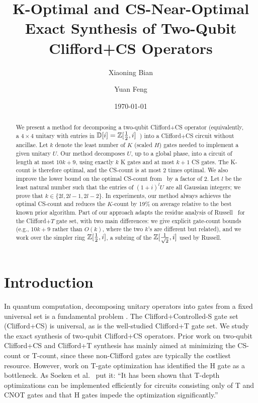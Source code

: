 \documentclass[reprint,amsmath,amssymb,aps,pra]{revtex4-2}
\begin{document}
\title{K-Optimal and CS-Near-Optimal Exact Synthesis of Two-Qubit
	Clifford+CS Operators}

\author{Xiaoning Bian} 

\author{Yuan Feng} 


\date{\today}

\begin{abstract}
  We present a method for decomposing a two-qubit Clifford+CS operator
  (equivalently, a $4\times 4$ unitary with entries in
  ${\mathbb D}[i] = \mathbb{Z}[\tfrac{1}{2}, i]$~\cite{Amy-Glaudell-Ross}) into a
  Clifford$+$CS circuit without ancillae. Let $k$ denote the least
  number of $K$ (scaled $H$) gates needed to implement a given unitary
  $U$. Our method decomposes $U$, up to a global phase, into a circuit
  of length at most $10k+9$, using exactly $k$ K gates and at most
  $k+1$ CS gates. The K-count is therefore optimal, and the CS-count
  is at most $2$ times optimal. We also improve the lower bound on the
  optimal CS-count from~\cite{Glaudell2021} by a factor of $2$. Let
  $l$ be the least natural number such that the entries of $(1+i)^l U$
  are all Gaussian integers; we prove that $k \in \{2l, 2l-1,
  2l-2\}$. In experiments, our method always achieves the optimal
  CS-count and reduces the $K$-count by 19\% on average relative to
  the best known prior algorithm. Part of our approach adapts the
  residue analysis of Russell~\cite{russell2014} for the Clifford$+T$
  gate set, with two main differences: we give explicit gate-count
  bounds (e.g., $10k+9$ rather than $O(k)$, where the two $k$'s are
  different but related), and we work over the simpler ring
  $\mathbb{Z}[\tfrac{1}{2}, i]$, a subring of the $\mathbb{Z}[\tfrac{1}{\sqrt 2}, i]$
  used by Russell.
\end{abstract}

\maketitle

\section{Introduction}

In quantum computation, decomposing unitary operators into gates from
a fixed universal set is a fundamental problem
\cite{Nielsen-Chuang}. The Clifford+Controlled-S gate set
(Clifford+CS) is universal, as is the well-studied Clifford+T gate
set. We study the exact synthesis of two-qubit Clifford+CS
operators. Prior work on two-qubit Clifford+CS and Clifford+T
synthesis has mainly aimed at minimizing the CS-count or T-count,
since these non-Clifford gates are typically the costliest
resource. However, work on T-gate optimization
\cite{Soken2014,AmyTOpt2014,Heyfron_2019,Kissinger2020,debeaudrap2020fast,de_Beaudrap_2020}
has identified the H gate as a bottleneck. As Soeken et
al.~\cite{Soken2014} put it: ``It has been shown that T-depth
optimizations can be implemented efficiently for circuits consisting
only of T and CNOT gates and that H gates impede the optimization
significantly.''
\end{document}
